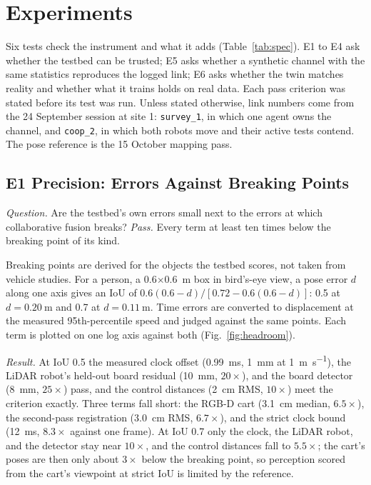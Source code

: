 \section{Experiments}
\label{sec:experiments}
Six tests check the instrument and what it adds (Table~\ref{tab:spec}).
E1 to E4 ask whether the testbed can be trusted; E5 asks whether a
synthetic channel with the same statistics reproduces the logged link; E6
asks whether the twin matches reality and whether what it trains
holds on real data. Each
pass criterion was stated before its test was run. Unless stated
otherwise, link numbers come from the 24 September session at site 1:
\texttt{survey\_1}, in which one agent owns the channel, and
\texttt{coop\_2}, in which both robots move and their active tests
contend. The pose reference is the 15 October mapping pass.



\subsection{E1 Precision: Errors Against Breaking Points}
\emph{Question.} Are the testbed's own errors small next to the errors
at which collaborative fusion breaks? \emph{Pass.} Every term at least
ten times below the breaking point of its kind.

Breaking points are derived for the objects the testbed scores, not
taken from vehicle studies. For a person, a
\SI{0.6}{}$\times$\SI{0.6}{\metre} box in bird's-eye view, a pose error
$d$ along one axis gives an IoU of $0.6(0.6-d)/[0.72-0.6(0.6-d)]$: 0.5 at
$d = \SI{0.20}{\metre}$ and 0.7 at $d = \SI{0.11}{\metre}$. Time errors
are converted to displacement at the measured 95th-percentile speed and
judged against the same points. Each term is plotted on one log axis
against both (Fig.~\ref{fig:headroom}).

\emph{Result.} At IoU 0.5 the measured clock offset (\SI{0.99}{\milli\second},
\SI{1}{\milli\metre} at \SI{1}{\metre\per\second}), the LiDAR robot's
held-out board residual (\SI{10}{\milli\metre}, $20\times$), and the
board detector (\SI{8}{\milli\metre}, $25\times$) pass, and the control
distances (\SI{2}{\centi\metre} RMS, $10\times$) meet the criterion
exactly. Three terms fall
short: the RGB-D cart (\SI{3.1}{\centi\metre} median, $6.5\times$), the
second-pass registration (\SI{3.0}{\centi\metre} RMS, $6.7\times$), and
the strict clock bound (\SI{12}{\milli\second}, $8.3\times$ against one
frame). At IoU 0.7 only the clock, the LiDAR robot, and the detector stay
near $10\times$, and the control distances fall to $5.5\times$; the cart's poses are then only about $3\times$ below the
breaking point, so perception scored from the cart's viewpoint at strict
IoU is limited by the reference. 


